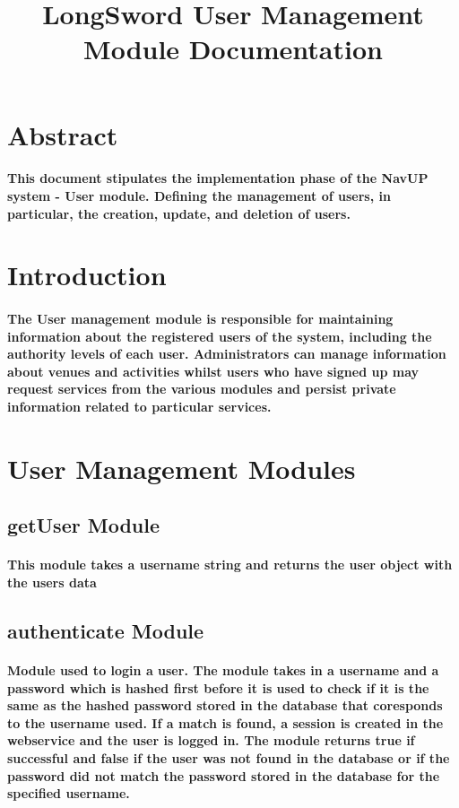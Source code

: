 \documentclass[11pt,a4paper]{article}
\begin{document}
\title{LongSword User Management Module Documentation}
\section{Abstract}
\paragraph{This document stipulates the implementation phase of the NavUP system - User module. Defining the management of users, in particular, the creation, update, and deletion of users.}



\section{Introduction}
\paragraph{The User management module is responsible for maintaining information about the registered users of the system, including the authority levels of each user. Administrators can manage information about venues and activities whilst users who have signed up may request services from the various modules and persist private information related to particular services.}

\section{User Management Modules}

\subsection{getUser Module}
\paragraph{This module takes a username string and returns the user object with the users data}

\subsection{authenticate Module}
\paragraph{Module used to login a user. The module takes in a username and a password which is hashed first before it is used to check if it is the same as the hashed password stored in the database that coresponds to the username used. If a match is found, a session is created in the webservice and the user is logged in. The module returns true if successful and false if the user was not found in the database or if the password did not match the password stored in the database for the specified username.}
\end{document}
